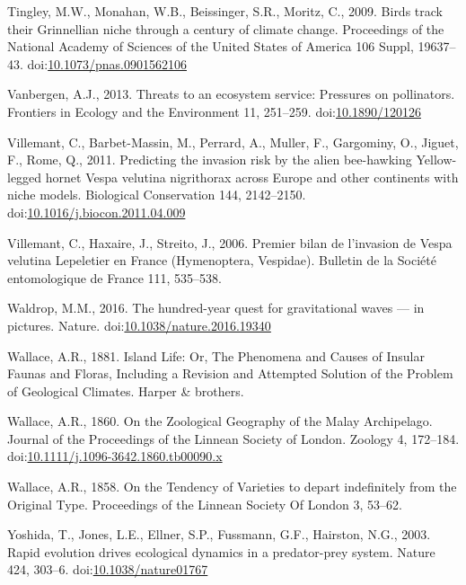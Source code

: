 \hypertarget{ref-Tingley2009}{}
Tingley, M.W., Monahan, W.B., Beissinger, S.R., Moritz, C., 2009. Birds
track their Grinnellian niche through a century of climate change.
Proceedings of the National Academy of Sciences of the United States of
America 106 Suppl, 19637--43.
doi:\href{https://doi.org/10.1073/pnas.0901562106}{10.1073/pnas.0901562106}

\hypertarget{ref-Vanbergen2013}{}
Vanbergen, A.J., 2013. Threats to an ecosystem service: Pressures on
pollinators. Frontiers in Ecology and the Environment 11, 251--259.
doi:\href{https://doi.org/10.1890/120126}{10.1890/120126}

\hypertarget{ref-Villemant2011}{}
Villemant, C., Barbet-Massin, M., Perrard, A., Muller, F., Gargominy,
O., Jiguet, F., Rome, Q., 2011. Predicting the invasion risk by the
alien bee-hawking Yellow-legged hornet Vespa velutina nigrithorax across
Europe and other continents with niche models. Biological Conservation
144, 2142--2150.
doi:\href{https://doi.org/10.1016/j.biocon.2011.04.009}{10.1016/j.biocon.2011.04.009}

\hypertarget{ref-Villemant2006}{}
Villemant, C., Haxaire, J., Streito, J., 2006. Premier bilan de
l'invasion de Vespa velutina Lepeletier en France (Hymenoptera,
Vespidae). Bulletin de la Société entomologique de France 111, 535--538.

\hypertarget{ref-Waldrop2016}{}
Waldrop, M.M., 2016. The hundred-year quest for gravitational waves ---
in pictures. Nature.
doi:\href{https://doi.org/10.1038/nature.2016.19340}{10.1038/nature.2016.19340}

\hypertarget{ref-wallace1881island}{}
Wallace, A.R., 1881. Island Life: Or, The Phenomena and Causes of
Insular Faunas and Floras, Including a Revision and Attempted Solution
of the Problem of Geological Climates. Harper \& brothers.

\hypertarget{ref-Wallace1860}{}
Wallace, A.R., 1860. On the Zoological Geography of the Malay
Archipelago. Journal of the Proceedings of the Linnean Society of
London. Zoology 4, 172--184.
doi:\href{https://doi.org/10.1111/j.1096-3642.1860.tb00090.x}{10.1111/j.1096-3642.1860.tb00090.x}

\hypertarget{ref-Wallace1858}{}
Wallace, A.R., 1858. On the Tendency of Varieties to depart indefinitely
from the Original Type. Proceedings of the Linnean Society Of London 3,
53--62.

\hypertarget{ref-Yoshida2003}{}
Yoshida, T., Jones, L.E., Ellner, S.P., Fussmann, G.F., Hairston, N.G.,
2003. Rapid evolution drives ecological dynamics in a predator-prey
system. Nature 424, 303--6.
doi:\href{https://doi.org/10.1038/nature01767}{10.1038/nature01767}
